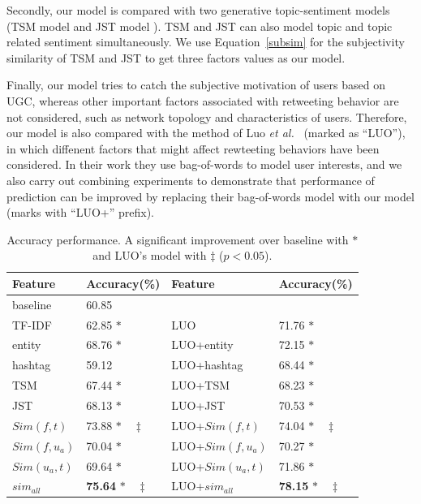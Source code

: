 \documentclass[letterpaper]{article}
\begin{document}
Secondly, our model is compared with two generative topic-sentiment models (TSM model \cite{mei2007topic} and JST model \cite{lin2009joint}). TSM and JST can also model topic and topic related sentiment simultaneously. We use Equation~\ref{subsim} for the subjectivity similarity of TSM and JST to get three factors values as our model.

Finally, our model tries to catch the subjective motivation of users based on UGC, whereas other important factors associated with retweeting behavior are not considered, such as network topology and characteristics of users. 
Therefore, our model is also compared with the method of Luo \emph{et al.}~ (marked as ``LUO''), in which diffenent factors that might affect rewteeting behaviors have been considered.
In their work they use bag-of-words to model user interests, and we also carry out combining experiments to demonstrate that performance of prediction can be improved by replacing their bag-of-words model with our model (marks with ``LUO+'' prefix). 
\begin{table}[htb]
\scriptsize
\centering
\caption{Accuracy performance. A significant improvement over baseline with $ \ast $ and LUO's model with $ \ddagger $ ($p < 0.05$).}
\label{tab3}
\begin{tabular}{|l|l|l|l|}
\hline
Feature & Accuracy(\%) & Feature & Accuracy(\%)\\
\hline
baseline & 60.85 & & \\
\hline
TF-IDF & 62.85   $\ast$ & LUO & 71.76 $ \ast  $\\
entity & 68.76  $\ast$ & LUO+entity & 72.15 $\ast$\\
hashtag & 59.12  & LUO+hashtag & 68.44 $\ast$\\
\hline
TSM & 67.44 $\ast$ & LUO+TSM & 68.23 $\ast$\\
JST & 68.13 $\ast$ & LUO+JST & 70.53 $\ast$\\
\hline
$ Sim(f,t) $ & 73.88   $\ast  \quad \ddagger $ &LUO+$ Sim(f,t)$ & 74.04  $ \ast \quad \ddagger $\\
$ Sim(f,u_a)  $ & 70.04   $\ast  $ & LUO+$ Sim(f,u_a)$ & 70.27  $ \ast $\\
$ Sim(u_a,t)  $ & 69.64   $\ast  $ & LUO+$ Sim(u_a,t)$ & 71.86  $ \ast $\\
$ sim_{all}  $ & \textbf{75.64}   $\ast \quad \ddagger $ & LUO+$ sim_{all}  $ & \textbf{78.15}  $ \ast \quad \ddagger $\\
\hline
\end{tabular}
\end{table}
\end{document}
